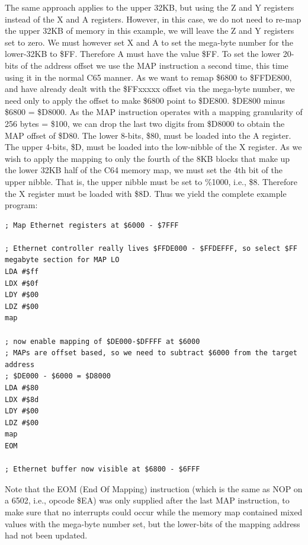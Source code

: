 The same approach applies to the upper 32KB, but using the Z and Y
registers instead of the X and A registers.  However, in this case, we do not need to re-map the upper 32KB of
memory in this example, we will leave the Z and Y registers set to zero.  We must however set X and A to
set the mega-byte number for the lower-32KB to \$FF. Therefore A must have the value \$FF.  To set the lower 20-bits
of the address offset we use the MAP instruction a second time, this time using it in the normal C65 manner.
As we want to remap \$6800 to \$FFDE800, and have already dealt with the \$FFxxxxx offset via the mega-byte number,
we need only to apply the offset to make \$6800 point to \$DE800. \$DE800 minus \$6800 = \$D8000.  As the MAP instruction
operates with a mapping granularity of 256 bytes = \$100, we can drop the last two digits from \$D8000 to obtain the
MAP offset of \$D80. The lower 8-bits, \$80, must be loaded into the A register. The upper 4-bits, \$D, must be loaded into
the low-nibble of the X register.  As we wish to apply the mapping to only the fourth of the 8KB blocks that make up the
lower 32KB half of the C64 memory map, we must set the 4th bit of the upper nibble. That is, the upper nibble must be set
to \%1000, i.e., \$8.  Therefore the X register must be loaded with \$8D.  Thus we yield the complete example program:

\begin{tcolorbox}[colback=black,coltext=white]
\verbatimfont{\codefont}
\begin{verbatim}
; Map Ethernet registers at $6000 - $7FFF

; Ethernet controller really lives $FFDE000 - $FFDEFFF, so select $FF megabyte section for MAP LO
LDA #$ff
LDX #$0f
LDY #$00
LDZ #$00
map

; now enable mapping of $DE000-$DFFFF at $6000
; MAPs are offset based, so we need to subtract $6000 from the target address
; $DE000 - $6000 = $D8000
LDA #$80
LDX #$8d
LDY #$00
LDZ #$00
map
EOM

; Ethernet buffer now visible at $6800 - $6FFF
\end{verbatim}
\end{tcolorbox}

Note that the EOM (End Of Mapping) instruction (which is the same as NOP on a 6502, i.e., opcode \$EA) was only supplied after the last MAP instruction, to make sure that no interrupts could occur while
the memory map contained mixed values with the mega-byte number set, but the lower-bits of the mapping address had not been
updated.

